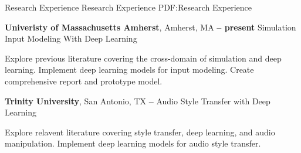 \Section
{Research Experience}
{Research Experience}
{PDF:Research Experience}

\Entry
\textbf{Univeristy of Massachusetts Amherst},
Amherst, MA 
\dotfill
\textbf{ -- present}
\Gap
Simulation Input Modeling With Deep Learning
\begin{Detail}
    \SubBulletItem
    Explore previous literature covering the cross-domain of simulation and deep learning.
    \SubBulletItem
    Implement deep learning models for input modeling.
    \SubBulletItem
    Create comprehensive report and prototype model.
\end{Detail}

\BigGap
\Entry
\textbf{Trinity University},
San Antonio, TX
\dotfill
\textbf{ -- }
\Gap
Audio Style Transfer with Deep Learning
\begin{Detail}
    \SubBulletItem
    Explore relavent literature covering style transfer, deep learning, and audio manipulation.
    \SubBulletItem
    Implement deep learning models for audio style transfer.
\end{Detail}